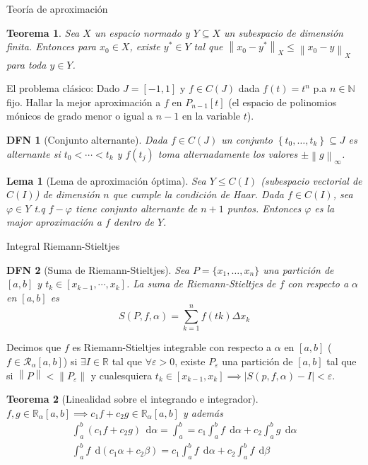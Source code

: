 \documentclass[a4paper]{article}\usepackage{/home/alonso/Documents/Projects/formularios/styles}
\newtheorem{definition}{DFN}
\theoremstyle{mytheoremstyle}
\newtheorem{theorem}{Teorema}
\newtheorem{lemma}{Lema}
\newcommand{\R}{\mathbb{R}}
\newcommand{\N}{\mathbb{N}}
\newcommand{\1}{\mathds{1}}
\newcommand{\norm}[1]{\left\|#1\right\|}
\newcommand{\diff}[1]{\,\mathrm{d}#1}
\begin{document}
\begin{multicols*}{3}
\begin{roundbox}{Teoría de aproximación}
\begin{theorem}
    Sea $X$ un espacio normado y $Y \subseteq X$ un subespacio de dimensión finita.
    Entonces para $x_0 \in X$, existe $y^* \in Y$ tal que $\norm{x_0 - y^*}_{X} \leq \norm{x_0 - y}_{X}$ para toda $y \in Y$.
\end{theorem}

El problema clásico: Dado $J=[-1, 1]$ y $f \in C(J)$ dada $f(t)=t^n$ p.a $n \in \N$ fijo.
Hallar la mejor aproximación a $f$ en $P_{n-1}[t]$ (el espacio de polinomios mónicos de grado menor o igual a $n-1$ en la variable $t$).

\begin{definition}[Conjunto alternante]
   Dada $f \in C(J)$ un conjunto $\left\{ t_0, \dots, t_k\right\} \subseteq J$ es alternante si $t_0 < \cdots <t_k$ y $f(t_j)$ toma alternadamente los valores $\pm \norm{g}_{\infty}$.
\end{definition}

\begin{lemma}[Lema de aproximación óptima]
    Sea $Y \leq C(I)$ (subespacio vectorial de $C(I)$) de dimensión $n$ que cumple la condición de Haar.
    Dada $f \in C(I)$, sea $\varphi \in Y$ t.q $f-\varphi$ tiene conjunto alternante de $n+1$ puntos.
Entonces $\varphi$ es la major aproximación a $f$ dentro de $Y$.
\end{lemma}
\end{roundbox}

\begin{roundbox}{Integral Riemann-Stieltjes}
\begin{definition}[Suma de Riemann-Stieltjes]
	Sea $P = \{x_1, \ldots, x_n\}$ una partición de $[a,b]$ y $t_k \in [x_{k-1}, \cdots, x_k]$.
	La suma de Riemann-Stieltjes de $f$ con respecto a $\alpha$ en $[a,b]$ es
	\[
		S(P, f, \alpha) = \sum_{k=1}^{n} f(tk) \Delta x_k
	\]
\end{definition}

Decimos que $f$ es Riemann-Stieltjes integrable con respecto a $\alpha$ en $[a,b]$ ($f \in \mathcal{R}_{\alpha}[a,b]$) si
$\exists I \in \R$ tal que $\forall\varepsilon > 0$,
existe $P_{\varepsilon}$ una partición de $[a,b]$ tal que si $\norm{P} < \norm{P_{\varepsilon}}$
y cualesquiera $t_k \in [x_{k-1}, x_k] \implies |S(p, f, \alpha) - I | < \varepsilon$.

\begin{theorem}[Linealidad sobre el integrando e integrador]
$f, g \in \mathbb{R}_{\alpha} [a,b] \implies c_1 f + c_2 g \in \mathbb{R}_{\alpha} [a,b]$ y además
\begin{align*}
	\int_{a}^{b} (c_1 f + c_2 g) \; \diff{\alpha} = \int_{a}^{b} = c_1 \int_{a}^{b} f \; \diff{\alpha} + c_2 \int_{a}^{b} g \; \diff{\alpha} \\
	\int_{a}^{b} f \; \diff{(c_1 \alpha + c_2 \beta)} = c_1 \int_{a}^{b} f \; \diff{\alpha} + c_2 \int_{a}^{b} f \; \diff{\beta}
\end{align*}
\end{theorem}


\end{roundbox}
\end{multicols*}
\end{document}
